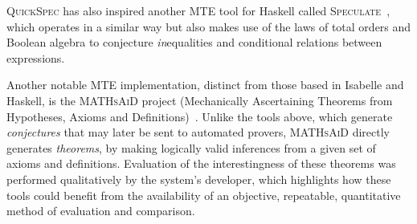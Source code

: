 \textsc{QuickSpec} has also inspired another MTE tool for Haskell called
\textsc{Speculate}~\cite{braquehais2017speculate}, which operates in a similar
way but also makes use of the laws of total orders and Boolean algebra to
conjecture \emph{in}equalities and conditional relations between expressions.

Another notable MTE implementation, distinct from those based in Isabelle and
Haskell, is the \textsc{MATHsAiD} project (Mechanically Ascertaining Theorems
from Hypotheses, Axioms and Definitions)~\cite{roy}. Unlike the tools above,
which generate \emph{conjectures} that may later be sent to automated provers,
\textsc{MATHsAiD} directly generates \emph{theorems}, by making logically valid
inferences from a given set of axioms and definitions. Evaluation of the
interestingness of these theorems was performed qualitatively by the system's
developer, which highlights how these tools could benefit from the availability
of an objective, repeatable, quantitative method of evaluation and comparison.

